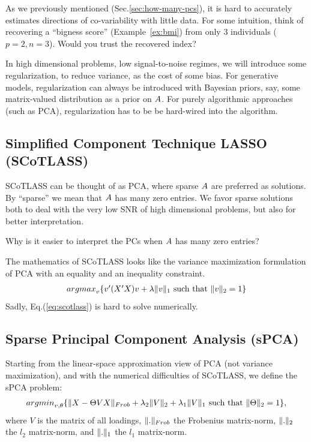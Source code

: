 \documentclass[12pt,a4paper]{article}
\begin{document}
As we previously mentioned (Sec.\ref{sec:how-many-pcs}), it is hard to accurately estimates directions of co-variability with little data. 
For some intuition, think of recovering a ``bigness score'' (Example~\ref{ex:bmi}) from only 3 individuals ($p=2,n=3$). 
Would you trust the recovered index?

In high dimensional problems, \aka low signal-to-noise regimes, we will introduce some regularization, to reduce variance, as the cost of some bias. 
For generative models, regularization can always be introduced with Bayesian priors, say, some matrix-valued distribution as a prior on $A$. 
For purely algorithmic approaches (such as PCA), regularization has to be be hard-wired into the algorithm.





\subsection{Simplified Component Technique LASSO (SCoTLASS)}

SCoTLASS can be thought of as PCA, where sparse $A$ are preferred as solutions.
By ``sparse'' we mean that $A$ has many zero entries. 
We favor sparse solutions both to deal with the very low SNR of high dimensional problems, but also for better interpretation.

\begin{think}
	Why is it easier to interpret the PCs when $A$ has many zero entries?
\end{think}

The mathematics of SCoTLASS looks like the variance maximization formulation of PCA with an equality and an inequality constraint.
\begin{align}
\label{eq:scotlass}
	\textstyle{\mathop{argmax}_{v}}\{ v'(X'X)v  + \lambda \Vert v \Vert_1 \text{ such that } \Vert v \Vert_2=1  \}
\end{align}
Sadly, Eq.(\ref{eq:scotlass}) is hard to solve numerically.


\subsection{Sparse Principal Component Analysis (sPCA)}
\label{sec:sPCA}

Starting from the linear-space approximation view of PCA (not variance maximization), and with the numerical difficulties of SCoTLASS, we define the sPCA problem:
\begin{align}
\label{eq:spca}
	\textstyle{\mathop{argmin}_{v,\theta}}\{ \Vert X-\Theta V X \Vert_{Frob} + \lambda_2 \Vert V \Vert_2 + \lambda_1 \Vert V \Vert_1 \text{ such that } \Vert \Theta \Vert_2=1 \},
\end{align}
where $V$ is the matrix of all loadings, $\Vert . \Vert_{Frob}$ the Frobenius matrix-norm, $\Vert . \Vert_2$ the $l_2$ matrix-norm, and $\Vert . \Vert_1$ the $l_1$ matrix-norm.
\end{document}
